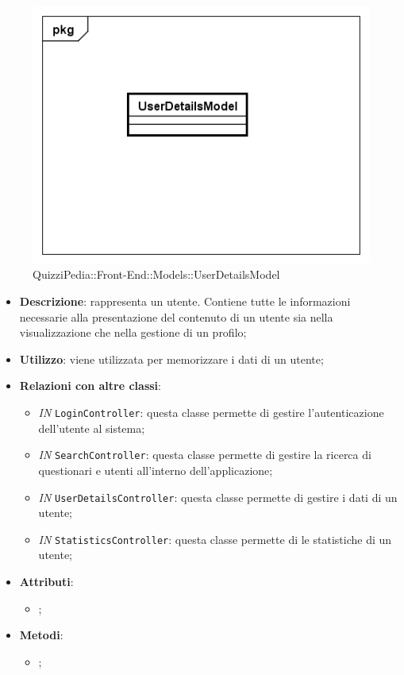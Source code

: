 		\label{QuizziPedia::Front-End::Models:.UserDetailsModel}
		
		\begin{figure}[h]
			\centering
			\includegraphics[scale=0.5,keepaspectratio]{UML/Classi/Front-End/QuizziPedia_Front-end_Models_UserDetailsModel.png}
			\caption{QuizziPedia::Front-End::Models::UserDetailsModel}
		\end{figure}
		
		\begin{itemize}
			\item \textbf{Descrizione}: rappresenta un utente. Contiene tutte le informazioni necessarie alla
			presentazione del contenuto di un utente sia nella visualizzazione che nella gestione di un profilo;
			\item \textbf{Utilizzo}: viene utilizzata per memorizzare i dati di un utente;
			\item \textbf{Relazioni con altre classi}: 
			\begin{itemize}
				\item \textit{IN} \texttt{LoginController}: questa classe permette di gestire l'autenticazione dell'utente al sistema;
				\item \textit{IN} \texttt{SearchController}: questa classe permette di gestire la ricerca di questionari e utenti all'interno dell'applicazione;
				\item \textit{IN} \texttt{UserDetailsController}: questa classe permette di gestire i dati di un utente;
				\item \textit{IN} \texttt{StatisticsController}: questa classe permette di le statistiche di un utente;
			\end{itemize}
			\item \textbf{Attributi}: 
			\begin{itemize}
				\item ;
			\end{itemize}
			\item \textbf{Metodi}: 
			\begin{itemize}
				\item ;
			\end{itemize}
		\end{itemize}													